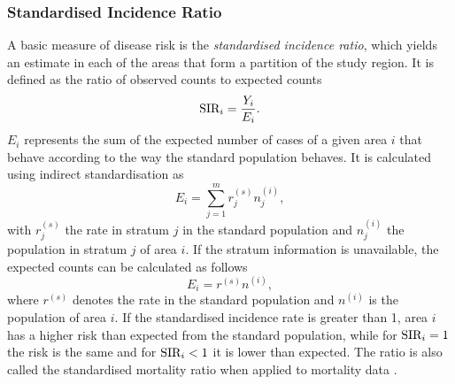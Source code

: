 \subsubsection{Standardised Incidence Ratio}
A basic measure of disease risk is the \textit{standardised incidence ratio}, which yields an estimate in each of the areas that form a partition of the study region. It is defined as the ratio of observed counts to expected counts
\begin{equation}
    \hbox{SIR}_i = \frac{Y_i}{E_i}.
\end{equation}
$E_i$ represents the sum of the expected number of cases of a given area $i$ that behave according to the way the standard population behaves. It is calculated using indirect standardisation as
\begin{equation}
    E_i=\sum_{j=1}^mr_j^{(s)}n_j^{(i)},
\end{equation}
with $r_j^{(s)}$ the rate in stratum $j$ in the standard population and $n_j^{(i)}$ the population in stratum $j$ of area $i$. If the stratum information is unavailable, the expected counts can be calculated as follows
\begin{equation*}
    E_i = r^{(s)}n^{(i)},
\end{equation*}
where $r^{(s)}$ denotes the rate in the standard population and $n^{(i)}$ is the population of area $i$. If the standardised incidence rate is greater than 1, area $i$ has a higher risk than expected from the standard population, while for $\hbox{SIR}_i = 1$ the risk is the same and for $\hbox{SIR}_i < 1$ it is lower than expected. The ratio is also called the standardised mortality ratio when applied to mortality data \autocite[][]{moraga2019geospatial}.
